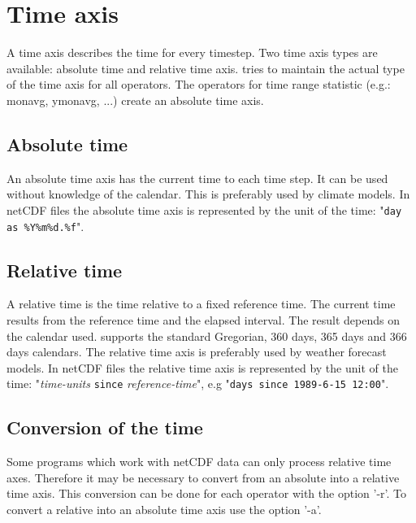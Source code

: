 \section{Time axis}

A time axis describes the time for every timestep.
Two time axis types are available: absolute time and relative time axis.
{\CDO} tries to maintain the actual type of the time axis for all operators.
The operators for time range statistic (e.g.: monavg, ymonavg, ...)
create an absolute time axis.

\subsection{Absolute time}

An absolute time axis has the current time to each time step.
It can be used without knowledge of the calendar.
This is preferably used by climate models.
In netCDF files the absolute time axis is represented by the 
unit of the time: {"{\tt day as \%Y\%m\%d.\%f}"}.

\subsection{Relative time}

A relative time is the time relative to a fixed reference time.
The current time results from the reference time and the elapsed interval.
The result depends on the calendar used.
{\CDO} supports the standard Gregorian, 360 days, 365 days and 366 days calendars.
The relative time axis is preferably used by weather forecast models.
In netCDF files the relative time axis is represented by the 
unit of the time: {"{\it time-units} {\tt since} {\it reference-time}"},
e.g "{\tt days since 1989-6-15 12:00}".

\subsection{Conversion of the time}

Some programs which work with netCDF data can only process relative time axes.
Therefore it may be necessary to convert from an absolute into a relative time axis.
This conversion can be done for each operator with the {\CDO} option '-r'.
To convert a relative into an absolute time axis use the {\CDO} option '-a'.
